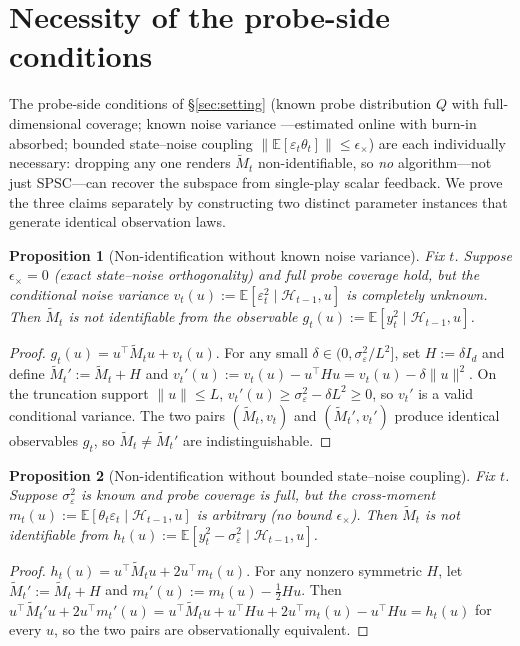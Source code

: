 \documentclass{article}
\newcommand{\E}{\mathbb{E}}
\newcommand{\cH}{\mathcal{H}}
\newtheorem{proposition}{Proposition}
\begin{document}
\section{Necessity of the probe-side conditions}
\label{app:necessity}

The probe-side conditions of \S\ref{sec:setting} (known probe
distribution $Q$ with full-dimensional coverage; known noise variance
---estimated online with burn-in absorbed; bounded state--noise
coupling $\|\E[\varepsilon_t\theta_t]\|\le\epsilon_\times$) are each
individually necessary: dropping any one renders $\widetilde M_t$
non-identifiable, so \emph{no} algorithm---not just SPSC---can recover
the subspace from single-play scalar feedback. We prove the three
claims separately by constructing two distinct parameter instances
that generate identical observation laws.

\begin{proposition}[Non-identification without known noise variance]
\label{prop:nonid_a}
Fix $t$. Suppose $\epsilon_\times=0$ (exact state--noise orthogonality)
and full probe coverage hold, but the conditional noise variance
$v_t(u):=\E[\varepsilon_t^2\mid\cH_{t-1},u]$ is completely unknown.
Then $\widetilde M_t$ is not identifiable from the observable
$g_t(u):=\E[y_t^2\mid\cH_{t-1},u]$.
\end{proposition}
\begin{proof}
$g_t(u) = u^\top\widetilde M_t u + v_t(u)$. For any small
$\delta\in(0,\sigma_\varepsilon^2/L^2]$, set $H:=\delta I_d$ and
define $\widetilde M_t':=\widetilde M_t + H$ and
$v_t'(u):=v_t(u) - u^\top H u = v_t(u)-\delta\|u\|^2$. On the
truncation support $\|u\|\le L$, $v_t'(u)\ge \sigma_\varepsilon^2 -
\delta L^2\ge 0$, so $v_t'$ is a valid conditional variance. The two
pairs $(\widetilde M_t,v_t)$ and $(\widetilde M_t',v_t')$ produce
identical observables $g_t$, so $\widetilde M_t\ne\widetilde M_t'$
are indistinguishable.
\end{proof}

\begin{proposition}[Non-identification without bounded state--noise coupling]
\label{prop:nonid_b}
Fix $t$. Suppose $\sigma_\varepsilon^2$ is known and probe coverage is
full, but the cross-moment
$m_t(u):=\E[\theta_t\varepsilon_t\mid\cH_{t-1},u]$ is arbitrary (no
bound $\epsilon_\times$). Then $\widetilde M_t$ is not identifiable
from $h_t(u):=\E[y_t^2-\sigma_\varepsilon^2\mid\cH_{t-1},u]$.
\end{proposition}
\begin{proof}
$h_t(u) = u^\top\widetilde M_t u + 2 u^\top m_t(u)$. For any nonzero
symmetric $H$, let $\widetilde M_t':=\widetilde M_t + H$ and
$m_t'(u):=m_t(u) - \tfrac{1}{2}Hu$. Then
$u^\top\widetilde M_t' u + 2 u^\top m_t'(u)
= u^\top\widetilde M_t u + u^\top H u + 2 u^\top m_t(u) - u^\top H u
= h_t(u)$ for every $u$, so the two pairs are observationally
equivalent.
\end{proof}
\end{document}

